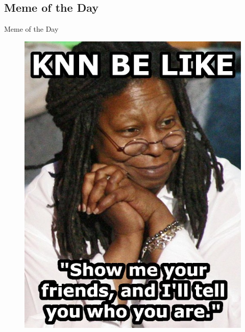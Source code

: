 \subsection{Meme of the Day}

\begin{frame}{Meme of the Day}{}
	\begin{figure}
		\includegraphics[scale=0.225]{06_knn/02_img/meme_of_the_day}
	\end{figure}
\end{frame}


\makethanks

